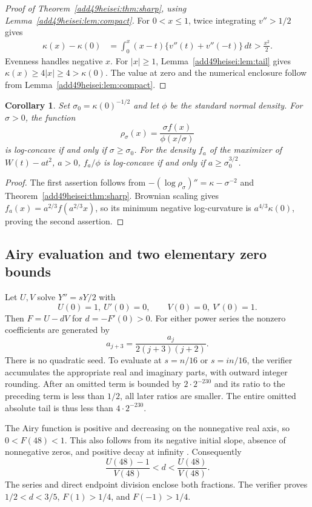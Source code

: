 \documentclass[11pt,a4paper]{article}
\numberwithin{equation}{section}
\newtheorem{corollary}[theorem]{Corollary}
\theoremstyle{definition}
\theoremstyle{remark}
\begin{document}
\begin{proof}[Proof of Theorem~\ref{add49heisei:thm:sharp}, using Lemma~\ref{add49heisei:lem:compact}]
For $0<x\le1$, twice integrating $v''>1/2$ gives
\begin{align*}
 \kappa(x)-\kappa(0)
 &=\int_0^x(x-t)\{v''(t)+v''(-t)\}\,dt
 >\frac{x^2}{2}.
\end{align*}
Evenness handles negative $x$. For $|x|\ge1$, Lemma~\ref{add49heisei:lem:tail} gives
$\kappa(x)\ge4|x|\ge4>\kappa(0)$. The value at zero and the numerical
enclosure follow from Lemma~\ref{add49heisei:lem:compact}.
\end{proof}

\begin{corollary}\label{add49heisei:cor:sharpgaussian}
Set $\sigma_0=\kappa(0)^{-1/2}$ and let $\phi$ be the standard normal
density. For $\sigma>0$, the function
\[
 \rho_\sigma(x)=\frac{\sigma f(x)}{\phi(x/\sigma)}
\]
is log-concave if and only if $\sigma\ge\sigma_0$.
For the density $f_a$ of the maximizer of $W(t)-at^2$, $a>0$,
$f_a/\phi$ is log-concave if and only if $a\ge\sigma_0^{3/2}$.
\end{corollary}
\begin{proof}
The first assertion follows from
$-(\log\rho_\sigma)''=\kappa-\sigma^{-2}$ and Theorem~\ref{add49heisei:thm:sharp}.
Brownian scaling gives $f_a(x)=a^{2/3}f(a^{2/3}x)$, so its minimum
negative log-curvature is $a^{4/3}\kappa(0)$, proving the second assertion.
\end{proof}

\subsection{Airy evaluation and two elementary zero bounds}
Let $U,V$ solve $Y''=sY/2$ with
\[
 U(0)=1,\ U'(0)=0,\qquad V(0)=0,\ V'(0)=1.
\]
Then $F=U-dV$ for $d=-F'(0)>0$. For either power series the nonzero
coefficients are generated by
\begin{equation}\label{add49heisei:eq:series}
 a_{j+3}=\frac{a_j}{2(j+3)(j+2)}.
\end{equation}
There is no quadratic seed. To evaluate at $s=n/16$ or $s=in/16$, the
verifier accumulates the appropriate real and imaginary parts, with
outward integer rounding. After an omitted term is bounded by
$2\cdot2^{-230}$ and its ratio to the preceding term is less than $1/2$,
all later ratios are smaller. The entire omitted absolute tail is thus
less than $4\cdot2^{-230}$.

The Airy function is positive and decreasing on the nonnegative real
axis, so $0<F(48)<1$. This also follows from its negative initial slope,
absence of nonnegative zeros, and positive decay at infinity
\cite[\S\S9.2,9.7,9.9]{add49heisei:dlmf}. Consequently
\begin{equation}\label{add49heisei:eq:slope}
 \frac{U(48)-1}{V(48)}<d<\frac{U(48)}{V(48)}.
\end{equation}
The series and direct endpoint division enclose both fractions. The
verifier proves $1/2<d<3/5$, $F(1)>1/4$, and $F(-1)>1/4$.
\end{document}
